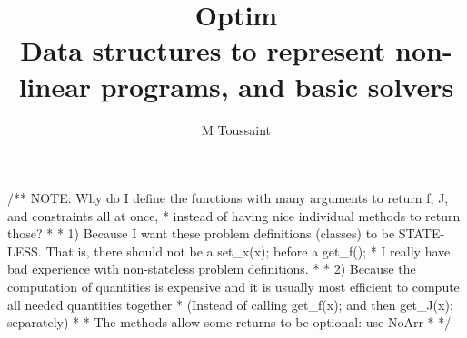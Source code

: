 \documentclass[10pt,fleqn,twoside]{article}
\title{Optim\\Data structures to represent non-linear programs, and
  basic solvers}
\author{M Toussaint}
\begin{document}
\maketitle



/** NOTE: Why do I define the functions with many arguments to return f, J, and constraints all at once,
 * instead of having nice individual methods to return those?
 *
 * 1) Because I want these problem definitions (classes) to be STATE-LESS. That is, there should not be a set_x(x); before a get_f();
 *    I really have bad experience with non-stateless problem definitions.
 *
 * 2) Because the computation of quantities is expensive and it is usually most efficient to compute all needed quantities together
 *    (Instead of calling get_f(x); and then get_J(x); separately)
 *
 * The methods allow some returns to be optional: use NoArr
 *
 */
\end{document}
